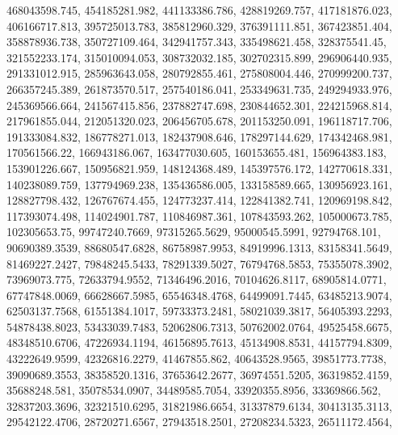 \begin{code}
\begin{hide}
{     468043598.745,     454185281.982,     441133386.786,
     428819269.757,     417181876.023,     406166717.813,
     395725013.783,     385812960.329,     376391111.851,
     367423851.404,     358878936.738,     350727109.464,
     342941757.343,     335498621.458,      328375541.45,
     321552233.174,     315010094.053,     308732032.185,
     302702315.899,     296906440.935,     291331012.915,
     285963643.058,     280792855.461,     275808004.446,
     270999200.737,     266357245.389,     261873570.517,
     257540186.041,     253349631.735,     249294933.976,
     245369566.664,     241567415.856,     237882747.698,
     230844652.301,     224215968.814,     217961855.044,
     212051320.023,     206456705.678,     201153250.091,
     196118717.706,     191333084.832,     186778271.013,
     182437908.646,     178297144.629,     174342468.981,
      170561566.22,     166943186.067,     163477030.605,
     160153655.481,     156964383.183,     153901226.667,
     150956821.959,     148124368.489,     145397576.172,
     142770618.331,     140238089.759,     137794969.238,
     135436586.005,     133158589.665,     130956923.161,
     128827798.432,     126767674.455,     124773237.414,
     122841382.741,     120969198.842,     117393074.498,
     114024901.787,     110846987.361,     107843593.262,
     105000673.785,      102305653.75,     99747240.7669,
     97315265.5629,     95000545.5991,      92794768.101,
     90690389.3539,     88680547.6828,     86758987.9953,
     84919996.1313,     83158341.5649,     81469227.2427,
     79848245.5433,     78291339.5027,     76794768.5853,
     75355078.3902,      73969073.775,     72633794.9552,
     71346496.2016,     70104626.8117,     68905814.0771,
     67747848.0069,     66628667.5985,     65546348.4768,
     64499091.7445,     63485213.9074,     62503137.7568,
     61551384.1017,     59733373.2481,     58021039.3817,
     56405393.2293,     54878438.8023,     53433039.7483,
     52062806.7313,     50762002.0764,     49525458.6675,
     48348510.6706,     47226934.1194,     46156895.7613,
     45134908.8531,     44157794.8309,     43222649.9599,
     42326816.2279,      41467855.862,     40643528.9565,
     39851773.7738,     39090689.3553,     38358520.1316,
     37653642.2677,     36974551.5205,     36319852.4159,
      35688248.581,     35078534.0907,     34489585.7054,
     33920355.8956,      33369866.562,     32837203.3696,
     32321510.6295,     31821986.6654,     31337879.6134,
     30413135.3113,     29542122.4706,     28720271.6567,
     27943518.2501,     27208234.5323,     26511172.4564,
}
\end{hide}
\end{code}
